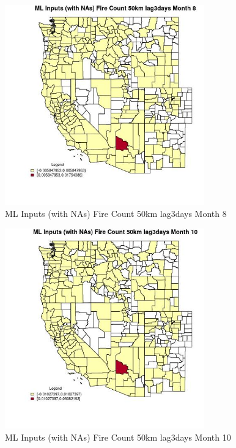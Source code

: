 \begin{figure} 
\centering  
\includegraphics[width=0.77\textwidth]{Code_Outputs/Report_ML_input_PM25_Step4_part_e_de_duplicated_aves_compiled_2019-05-20wNAs_CountyFire_Count_50km_lag3daysmedianMonth8.jpg} 
\caption{\label{fig:Report_ML_input_PM25_Step4_part_e_de_duplicated_aves_compiled_2019-05-20wNAsCountyFire_Count_50km_lag3daysmedianMonth8}ML Inputs (with NAs) Fire Count 50km lag3days Month 8} 
\end{figure} 
 

\begin{figure} 
\centering  
\includegraphics[width=0.77\textwidth]{Code_Outputs/Report_ML_input_PM25_Step4_part_e_de_duplicated_aves_compiled_2019-05-20wNAs_CountyFire_Count_50km_lag3daysmedianMonth10.jpg} 
\caption{\label{fig:Report_ML_input_PM25_Step4_part_e_de_duplicated_aves_compiled_2019-05-20wNAsCountyFire_Count_50km_lag3daysmedianMonth10}ML Inputs (with NAs) Fire Count 50km lag3days Month 10} 
\end{figure} 
 

